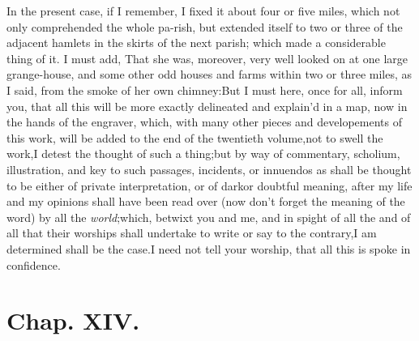 \documentclass{article}
\begin{document}
In the present case, if I remember, I fixed it about four or
five miles, which not only comprehended the whole pa-\pb rish, but
extended itself to two or three of the adjacent hamlets in the
skirts of the next parish; which made a considerable thing of it. I
must add, That she was, moreover, very well looked on at one large
grange-house, and some other odd houses and farms within two or
three miles, as I said, from the smoke of her own
chimney:\tsh  But I must here, once for all, inform you,
that all this will be more exactly delineated and explain’d
in a map, now in the hands of the engraver, which, with many other
pieces and developements of this work, will be added to the end of
the twentieth volume,\tsk  not to swell the work,\tsk  I detest
the thought of such a thing;\tsk  but by way of commentary,
scholium, illustration, and key to such passages, incidents, or
innuendos as shall be thought to be either of private
interpretation, or of dark\pb or doubtful meaning, after my life and
my opinions shall have been read over (now don’t forget the
meaning of the word) by all the \textit{world};\tsh  which,
betwixt you and me, and in spight of all the\break 
{} and of all that their worships shall
under\-take to write or say to the contrary,\tsh\break  I am determined
shall be the case.\tsk  I need not tell your worship, that all
this is spoke in confidence.

\section{Chap. XIV.}
\end{document}
